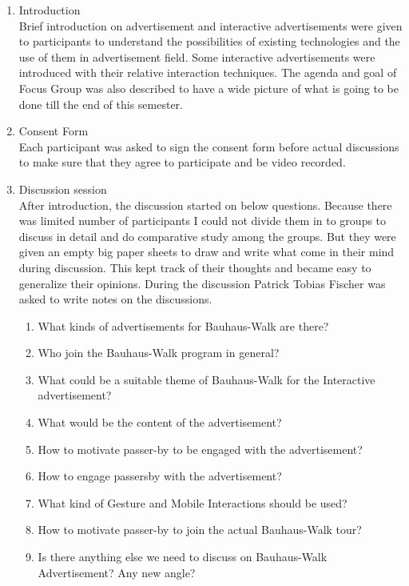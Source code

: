 \begin{enumerate}
\item Introduction \\
Brief introduction on advertisement and interactive advertisements were given to participants to understand the possibilities of existing technologies and the use of them in advertisement field. Some interactive advertisements were introduced with their relative interaction techniques. The agenda and goal of Focus Group was also described to have a wide picture of what is going to be done till the end of this semester.

\item Consent Form \\
Each participant was asked to sign the consent form before actual discussions to make sure that they agree to participate and be video recorded.

\item Discussion session \\
After introduction, the discussion started on below questions. Because there was limited number of participants I could not divide them in to groups to discuss in detail and do comparative study among the groups. But they were given an empty big paper sheets to draw and write what come in their mind during discussion. This kept track of their thoughts and became easy to generalize their opinions. During the discussion Patrick Tobias Fischer was asked to write notes on the discussions.

\begin{enumerate}
\item   What kinds of advertisements for Bauhaus-Walk are there?
\item   Who join the Bauhaus-Walk program in general?
\item   What could be a suitable theme of Bauhaus-Walk for the Interactive advertisement?
\item   What would be the content of the advertisement?
\item   How to motivate passer-by to be engaged with the advertisement?
\item   How to engage passersby with the advertisement?
\item   What kind of Gesture and Mobile Interactions should be used?
\item   How to motivate passer-by to join the actual Bauhaus-Walk tour?
\item   Is there anything else we need to discuss on Bauhaus-Walk Advertisement? Any new angle?

\end{enumerate}


\end{enumerate}


